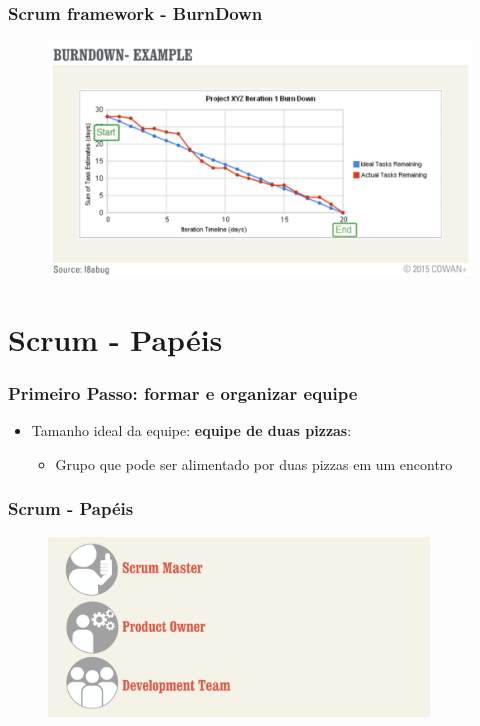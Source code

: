 \begin{frame}
 \frametitle{Scrum framework -  BurnDown}
  \begin{figure}
   \centering
   \includegraphics[width = \textwidth]{figs/fases_burndown_exemplo.png}
  \end{figure}
\end{frame}

\section{Scrum - Papéis}
\begin{frame}
 \frametitle{Primeiro Passo: formar e organizar equipe}
 \begin{itemize}
  \item Tamanho ideal da equipe: \textbf{equipe de duas pizzas}:
  \begin{itemize}
   \item Grupo que pode ser alimentado por duas pizzas em um encontro
  \end{itemize}
 \end{itemize}
\end{frame}

\begin{frame}
 \frametitle{Scrum - Papéis}
  \begin{figure}
   \centering
   \includegraphics[width = 0.9\textwidth]{figs/scrum_papeis.png}
  \end{figure}
\end{frame}

